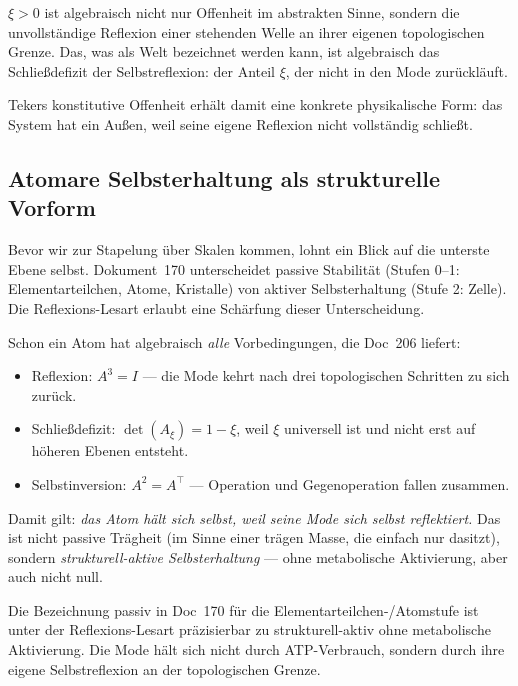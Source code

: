 \begin{important}
$\xi > 0$ ist algebraisch nicht nur \glqq Offenheit\grqq{} im abstrakten Sinne, sondern die unvollständige Reflexion einer stehenden Welle an ihrer eigenen topologischen Grenze. Das, was als \glqq Welt\grqq{} bezeichnet werden kann, ist algebraisch das Schließdefizit der Selbstreflexion: der Anteil $\xi$, der nicht in den Mode zurückläuft.

Tekers konstitutive Offenheit erhält damit eine konkrete physikalische Form: das System hat ein Außen, weil seine eigene Reflexion nicht vollständig schließt.
\end{important}

\subsection{Atomare Selbsterhaltung als strukturelle Vorform}\label{sec:reflexion_atom}

Bevor wir zur Stapelung über Skalen kommen, lohnt ein Blick auf die unterste Ebene selbst. Dokument~170 unterscheidet \glqq passive Stabilität\grqq{} (Stufen 0--1: Elementarteilchen, Atome, Kristalle) von \glqq aktiver Selbsterhaltung\grqq{} (Stufe 2: Zelle). Die Reflexions-Lesart erlaubt eine Schärfung dieser Unterscheidung.

Schon ein Atom hat algebraisch \emph{alle} Vorbedingungen, die Doc~206 liefert:

\begin{itemize}
\item Reflexion: $A^3 = I$ --- die Mode kehrt nach drei topologischen Schritten zu sich zurück.
\item Schließdefizit: $\det(A_\xi) = 1 - \xi$, weil $\xi$ universell ist und nicht erst auf höheren Ebenen entsteht.
\item Selbstinversion: $A^2 = A^\top$ --- Operation und Gegenoperation fallen zusammen.
\end{itemize}

Damit gilt: \emph{das Atom hält sich selbst, weil seine Mode sich selbst reflektiert.} Das ist nicht passive Trägheit (im Sinne einer trägen Masse, die einfach nur dasitzt), sondern \emph{strukturell-aktive Selbsterhaltung} --- ohne metabolische Aktivierung, aber auch nicht null.

\begin{insightBox}
Die Bezeichnung \glqq passiv\grqq{} in Doc~170 für die Elementarteilchen-/Atomstufe ist unter der Reflexions-Lesart präzisierbar zu \glqq strukturell-aktiv ohne metabolische Aktivierung\grqq{}. Die Mode hält sich nicht durch ATP-Verbrauch, sondern durch ihre eigene Selbstreflexion an der topologischen Grenze.
\end{insightBox}

